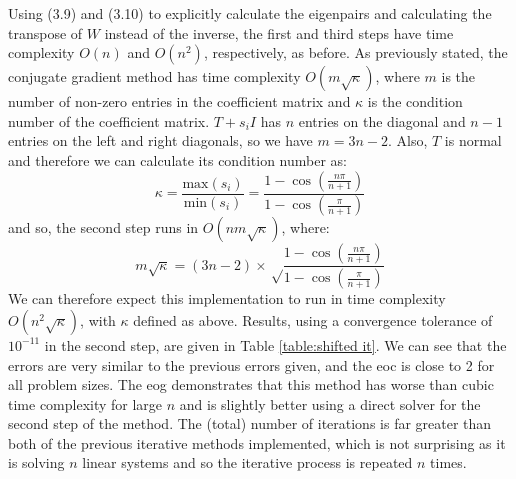 \documentclass[11pt]{article}
\numberwithin{equation}{section}
\begin{document}
Using (3.9) and (3.10) to explicitly calculate the eigenpairs and calculating the transpose of $W$ instead of the inverse, the first and third steps have time complexity $O(n)$ and $O(n^2)$, respectively, as before. As previously stated, the conjugate gradient method has time complexity $O(m\sqrt{\kappa})$, where $m$ is the number of non-zero entries in the coefficient matrix and $\kappa$ is the condition number of the coefficient matrix. $T+s_i I$ has $n$ entries on the diagonal and $n-1$ entries on the left and right diagonals, so we have $m=3n-2$. Also, $T$ is normal and therefore we can calculate its condition number as:
\begin{equation}
\kappa = \frac{\text{max}(s_i)}{\text{min}(s_i)} = \frac{1-\cos \left(\frac{n \pi}{n+1} \right)}{1-\cos \left(\frac{\pi}{n+1} \right)}
\end{equation}
and so, the second step runs in $O(n m\sqrt{\kappa})$, where:
\begin{equation}
m\sqrt{\kappa} = (3n-2) \times \sqrt \frac{1-\cos \left(\frac{n \pi}{n+1} \right)}{1-\cos \left(\frac{\pi}{n+1} \right)}
\end{equation}
We can therefore expect this implementation to run in time complexity $O(n^2 \sqrt{\kappa})$, with $\kappa$ defined as above. Results, using a convergence tolerance of $10^{-11}$ in the second step, are given in Table \ref{table:shifted it}. We can see that the errors are very similar to the previous errors given, and the eoc is close to 2 for all problem sizes. The eog demonstrates that this method has worse than cubic time complexity for large $n$ and is slightly better using a direct solver for the second step of the method. The (total) number of iterations is far greater than both of the previous iterative methods implemented, which is not surprising as it is solving $n$ linear systems and so the iterative process is repeated $n$ times. 
\end{document}
